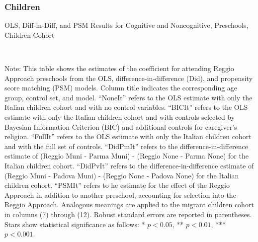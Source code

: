 \begin{landscape}
\subsubsection{Children}
\begin{table}[H] \caption{OLS, Diff-in-Diff, and PSM Results for Cognitive and Noncognitive, Preschools, Children Cohort} \label{ols-E-reg}
\scalebox{0.80}{}
\vspace{1ex} \\
\footnotesize\raggedright{Note: This table shows the estimates of the coefficient for attending Reggio Approach preschools from the OLS, difference-in-difference (Did), and propensity score matching (PSM) models. Column title indicates the corresponding age group, control set, and model. ``NoneIt'' refers to the OLS estimate with only the Italian children cohort and with no control variables. ``BICIt'' refers to the OLS estimate with only the Italian children cohort and with controls selected by Bayesian Information Criterion (BIC) and additional controls for caregiver's religion. ``FullIt'' refers to the OLS estimate with only the Italian children cohort and with the full set of controls. ``DidPmIt'' refers to the difference-in-difference estimate of (Reggio Muni - Parma Muni) - (Reggio None - Parma None) for the Italian children cohort. ``DidPvIt'' refers to the difference-in-difference estimate of (Reggio Muni - Padova Muni) - (Reggio None - Padova None) for the Italian children cohort. ``PSMIt'' refers to he estimate for the effect of the Reggio Approach in addition to another preschool, accounting for selection into the Reggio Approach. Analogous meanings are applied to the migrant children cohort in columns (7) through (12). Robust standard errors are reported in parentheses. Stars show statistical significance as follows: * $p < 0.05$, ** $p < 0.01$, *** $p < 0.001$.}
\end{table}



\end{landscape}

